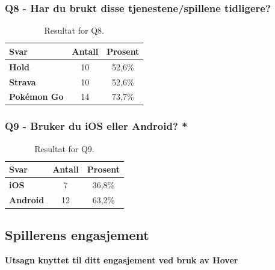 \subsubsection*{Q8 - Har du brukt disse tjenestene/spillene tidligere?}
 \begin{table}[H]
    \centering
    \begin{tabularx}{0.4\textwidth}{|>{\bfseries}X|c|c|}
        \hline
        \textbf{Svar} & \textbf{Antall} & \textbf{Prosent}  \\  \hline
        Hold & 10 & 52,6\%  \\ 
        Strava & 10 & 52,6\%  \\ 
        Pokémon Go & 14 & 73,7\% \\
         \hline
    \end{tabularx}
    \caption{Resultat for Q8.}
\end{table}

\subsubsection*{Q9 - Bruker du iOS eller Android? *}
 \begin{table}[H]
    \centering
    \begin{tabularx}{0.4\textwidth}{|>{\bfseries}X|c|c|}
        \hline
        \textbf{Svar} & \textbf{Antall} & \textbf{Prosent}  \\  \hline
        iOS & 7 & 36,8\%  \\ 
        Android & 12 & 63,2\% \\
         \hline
    \end{tabularx}
    \caption{Resultat for Q9.}
\end{table}

\newpage
\subsection*{Spillerens engasjement}
\textbf{Utsagn knyttet til ditt engasjement ved bruk av Hover}

